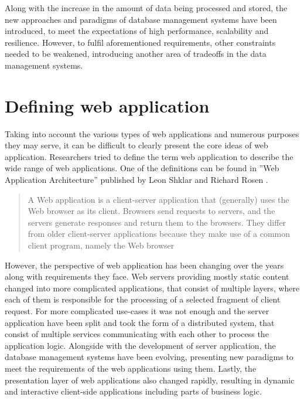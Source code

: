 Along with the increase in the amount of data being processed and stored, the new approaches and paradigms of database management systems have been introduced, to meet the expectations of high performance, scalability and resilience. However, to fulfil aforementioned requirements, other constraints needed to be weakened, introducing another area of tradeoffs in the data management systems.

\section{Defining web application} \label{chapter:web-apps-definition}

Taking into account the various types of web applications and numerous purposes they may serve, it can be difficult to clearly present the core ideas of web application. Researchers tried to define the term web application to describe the wide range of web applications. One of the definitions can be found in ''Web Application Architecture'' published by Leon Shklar and Richard Rosen \cite{WebAppArchitecture}.

\begin{quotation}
A Web application is a client-server application that (generally) uses the Web browser as its client. Browsers send requests to servers, and the servers generate responses and return them to the browsers. They differ from older client-server applications because they make use of a common client program, namely the Web browser
\end{quotation}

However, the perspective of web application has been changing over the years along with requirements they face. Web servers providing mostly static content changed into more complicated applications, that consist of multiple layers, where each of them is responsible for the processing of a selected fragment of client request. For more complicated use-cases it was not enough and the server application have been split and took the form of a distributed system, that consist of multiple services communicating with each other to process the application logic. Alongside with the development of server application, the database management systems have been evolving, presenting new paradigms to meet the requirements of the web applications using them. Lastly, the presentation layer of web applications also changed rapidly, resulting in dynamic and interactive client-side applications including parts of business logic.

